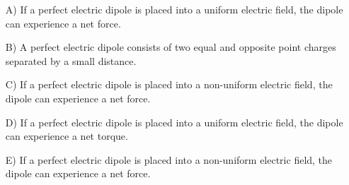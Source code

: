 \documentclass[11pt]{article}
\begin{document}
\begin{itemize}
	\item[A)] If a perfect electric dipole is placed into a uniform electric field, the dipole can experience a net force.
	\item[B)] A perfect electric dipole consists of two equal and opposite point charges separated by a small distance.
	\item[C)] If a perfect electric dipole is placed into a non-uniform electric field, the dipole can experience a net force.
	\item[D)] If a perfect electric dipole is placed into a uniform electric field, the dipole can experience a net torque.
	\item[E)] If a perfect electric dipole is placed into a non-uniform electric field, the dipole can experience a net force.
\end{itemize}

\end{document}
